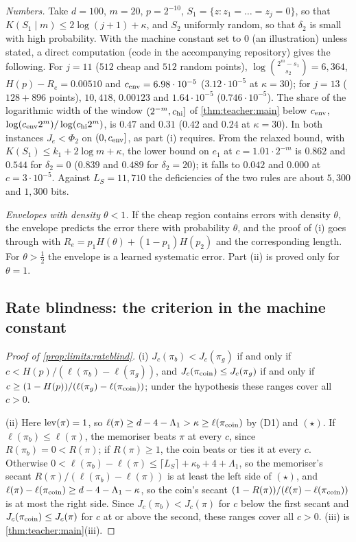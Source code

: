 \emph{Numbers.} Take $d=100$, $m=20$, $p=2^{-10}$, $S_1=\{z:z_1=\dots=z_j=0\}$, so that $K(S_1\mid m)\le2\log(j+1)+\kappa$, and $S_2$ uniformly random, so that $\delta_2$ is small with high probability. With the machine constant set to $0$ (an illustration) unless stated, a direct computation (code in the accompanying repository) gives the following. For $j=11$ ($512$ cheap and $512$ random points), $\log\binom{2^m-s_1}{s_2}=6{,}364$, $H(p)-R_e=0.00510$ and $c_{\rm env}=6.98\cdot10^{-5}$ ($3.12\cdot10^{-5}$ at $\kappa=30$); for $j=13$ ($128+896$ points), $10{,}418$, $0.00123$ and $1.64\cdot10^{-5}$ ($0.746\cdot10^{-5}$). The share of the logarithmic width of the window $(2^{-m},c_{\rm hi}]$ of \cref{thm:teacher:main} below $c_{\rm env}$, $\log(c_{\rm env}2^m)/\log(c_{\rm hi}2^m)$, is $0.47$ and $0.31$ ($0.42$ and $0.24$ at $\kappa=30$). In both instances $J_e<\Phi_2$ on $(0,c_{\rm env}]$, as part (i) requires. From the relaxed bound, with $K(S_1)\le k_1+2\log m+\kappa$, the lower bound on $e_1$ at $c=1.01\cdot2^{-m}$ is $0.862$ and $0.544$ for $\delta_2=0$ ($0.839$ and $0.489$ for $\delta_2=20$); it falls to $0.042$ and $0.000$ at $c=3\cdot10^{-5}$. Against $L_S=11{,}710$ the deficiencies of the two rules are about $5{,}300$ and $1{,}300$ bits.

\emph{Envelopes with density $\theta<1$.} If the cheap region contains errors with density $\theta$, the envelope predicts the error there with probability $\theta$, and the proof of (i) goes through with $R_e=p_1H(\theta)+(1-p_1)H(p_2)$ and the corresponding length. For $\theta>\frac12$ the envelope is a learned systematic error. Part (ii) is proved only for $\theta=1$.

\subsection{Rate blindness: the criterion in the machine constant}\label{app:limits:robust}

\begin{proof}[Proof of \cref{prop:limits:rateblind}]
(i) $J_c(\pi_b)<J_c(\pi_g)$ if and only if $c<H(p)/(\ell(\pi_b)-\ell(\pi_g))$, and $J_c(\pi_{\rm coin})\le J_c(\pi_g)$ if and only if $c\ge(1-H(p))/(\ell(\pi_g)-\ell(\pi_{\rm coin}))$; under the hypothesis these ranges cover all $c>0$.

(ii) Here $\operatorname{lev}(\pi)=1$, so $\ell(\pi)\ge d-4-\Lambda_1>\kappa\ge\ell(\pi_{\rm coin})$ by (D1) and $(\star)$. If $\ell(\pi_b)\le\ell(\pi)$, the memoriser beats $\pi$ at every $c$, since $R(\pi_b)=0<R(\pi)$; if $R(\pi)\ge1$, the coin beats or ties it at every $c$. Otherwise $0<\ell(\pi_b)-\ell(\pi)\le\lceil L_S\rceil+\kappa_b+4+\Lambda_1$, so the memoriser's secant $R(\pi)/(\ell(\pi_b)-\ell(\pi))$ is at least the left side of $(\star)$, and $\ell(\pi)-\ell(\pi_{\rm coin})\ge d-4-\Lambda_1-\kappa$, so the coin's secant $(1-R(\pi))/(\ell(\pi)-\ell(\pi_{\rm coin}))$ is at most the right side. Since $J_c(\pi_b)<J_c(\pi)$ for $c$ below the first secant and $J_c(\pi_{\rm coin})\le J_c(\pi)$ for $c$ at or above the second, these ranges cover all $c>0$. (iii) is \cref{thm:teacher:main}(iii).
\end{proof}

